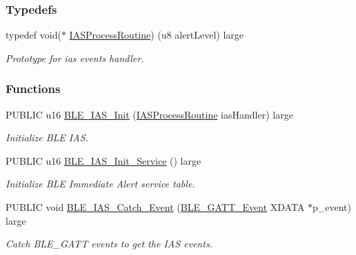 \subsubsection*{Typedefs}
\begin{DoxyCompactItemize}
\item 
typedef void($\ast$ \hyperlink{group___b_l_e___i_a_s_ga1b57811481340dbd1b537b248abb0153}{I\+A\+S\+Process\+Routine}) (u8 alert\+Level) large\hypertarget{group___b_l_e___i_a_s_ga1b57811481340dbd1b537b248abb0153}{}\label{group___b_l_e___i_a_s_ga1b57811481340dbd1b537b248abb0153}

\begin{DoxyCompactList}\small\item\em Prototype for ias events handler. \end{DoxyCompactList}\end{DoxyCompactItemize}
\subsubsection*{Functions}
\begin{DoxyCompactItemize}
\item 
P\+U\+B\+L\+IC u16 \hyperlink{group___b_l_e___i_a_s_ga1105dfb9750c45ae183fa062331ee113}{B\+L\+E\+\_\+\+I\+A\+S\+\_\+\+Init} (\hyperlink{group___b_l_e___i_a_s_ga1b57811481340dbd1b537b248abb0153}{I\+A\+S\+Process\+Routine} ias\+Handler) large
\begin{DoxyCompactList}\small\item\em Initialize B\+LE I\+AS. \end{DoxyCompactList}\item 
P\+U\+B\+L\+IC u16 \hyperlink{group___b_l_e___i_a_s_gac5b78e9f1b5ff26de94863c1b9410d3b}{B\+L\+E\+\_\+\+I\+A\+S\+\_\+\+Init\+\_\+\+Service} () large
\begin{DoxyCompactList}\small\item\em Initialize B\+LE Immediate Alert service table. \end{DoxyCompactList}\item 
P\+U\+B\+L\+IC void \hyperlink{group___b_l_e___i_a_s_ga9c04f40a3eab96352ea0210436398650}{B\+L\+E\+\_\+\+I\+A\+S\+\_\+\+Catch\+\_\+\+Event} (\hyperlink{struct_b_l_e___g_a_t_t___event}{B\+L\+E\+\_\+\+G\+A\+T\+T\+\_\+\+Event} X\+D\+A\+TA $\ast$p\+\_\+event) large
\begin{DoxyCompactList}\small\item\em Catch B\+L\+E\+\_\+\+G\+A\+TT events to get the I\+AS events. \end{DoxyCompactList}\end{DoxyCompactItemize}


